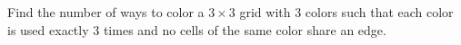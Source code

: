 Find the number of ways to color a $3\times 3$ grid with $3$ colors such that each color is used exactly $3$ times and no cells of the same color share an edge.
